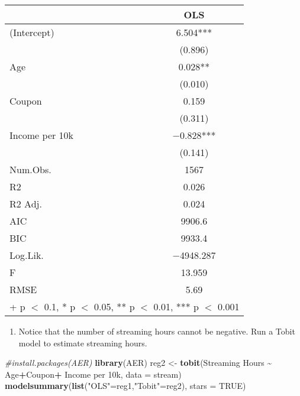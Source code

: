 \documentclass[
]{article}
\newenvironment{Shaded}{\begin{snugshade}}{\end{snugshade}}
\newcommand{\AttributeTok}[1]{\textcolor[rgb]{0.13,0.29,0.53}{#1}}
\newcommand{\CommentTok}[1]{\textcolor[rgb]{0.56,0.35,0.01}{\textit{#1}}}
\newcommand{\ConstantTok}[1]{\textcolor[rgb]{0.56,0.35,0.01}{#1}}
\newcommand{\FunctionTok}[1]{\textcolor[rgb]{0.13,0.29,0.53}{\textbf{#1}}}
\newcommand{\NormalTok}[1]{#1}
\newcommand{\OtherTok}[1]{\textcolor[rgb]{0.56,0.35,0.01}{#1}}
\newcommand{\SpecialCharTok}[1]{\textcolor[rgb]{0.81,0.36,0.00}{\textbf{#1}}}
\newcommand{\StringTok}[1]{\textcolor[rgb]{0.31,0.60,0.02}{#1}}
\providecommand{\tightlist}{%
  \setlength{\itemsep}{0pt}\setlength{\parskip}{0pt}}
\begin{document}
\begin{table}
\centering
\begin{tabular}[t]{lc}
\toprule
  & OLS\\
\midrule
(Intercept) & \num{6.504}***\\
 & (\num{0.896})\\
Age & \num{0.028}**\\
 & (\num{0.010})\\
Coupon & \num{0.159}\\
 & (\num{0.311})\\
Income per 10k & \num{-0.828}***\\
 & (\num{0.141})\\
\midrule
Num.Obs. & \num{1567}\\
R2 & \num{0.026}\\
R2 Adj. & \num{0.024}\\
AIC & \num{9906.6}\\
BIC & \num{9933.4}\\
Log.Lik. & \num{-4948.287}\\
F & \num{13.959}\\
RMSE & \num{5.69}\\
\bottomrule
\multicolumn{2}{l}{\rule{0pt}{1em}+ p $<$ 0.1, * p $<$ 0.05, ** p $<$ 0.01, *** p $<$ 0.001}\\
\end{tabular}
\end{table}

\begin{enumerate}
\def\labelenumi{\alph{enumi})}
\setcounter{enumi}{2}
\tightlist
\item
  Notice that the number of streaming hours cannot be negative. Run a
  Tobit model to estimate streaming hours.
\end{enumerate}

\begin{Shaded}
\begin{Highlighting}[]
\CommentTok{\#install.packages(\textquotesingle{}AER\textquotesingle{})}
\FunctionTok{library}\NormalTok{(AER)}
\NormalTok{reg2 }\OtherTok{\textless{}{-}} \FunctionTok{tobit}\NormalTok{(}\StringTok{\textasciigrave{}}\AttributeTok{Streaming Hours}\StringTok{\textasciigrave{}} \SpecialCharTok{\textasciitilde{}}\NormalTok{ Age}\SpecialCharTok{+}\NormalTok{Coupon}\SpecialCharTok{+} \StringTok{\textasciigrave{}}\AttributeTok{Income per 10k}\StringTok{\textasciigrave{}}\NormalTok{, }\AttributeTok{data =}\NormalTok{ stream)}
\FunctionTok{modelsummary}\NormalTok{(}\FunctionTok{list}\NormalTok{(}\StringTok{"OLS"}\OtherTok{=}\NormalTok{reg1,}\StringTok{"Tobit"}\OtherTok{=}\NormalTok{reg2), }\AttributeTok{stars =} \ConstantTok{TRUE}\NormalTok{)}
\end{Highlighting}
\end{Shaded}
\end{document}
